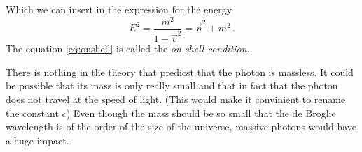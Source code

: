 Which we can insert in the expression for the energy
\begin{equation}
E^2=\frac{m^2}{1-\vec{v}^2}=\vec{p}^2+m^2 \label{eq:onshell}\, .
\end{equation}
The equation \eqref{eq:onshell} is called the \emph{on shell condition}.
\begin{sidenote}
There is nothing in the theory that predicst that the photon is massless. It
could be possible that its mass is only really small and that in fact that the
photon does not travel at the speed of light. (This would make it
convinient to rename the constant $c$) Even though the mass should be so small
that the de Broglie wavelength is of the order of the size of the universe,
massive photons would have a huge impact.
\end{sidenote}
